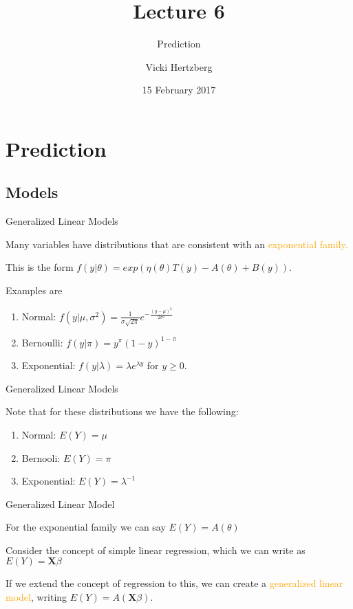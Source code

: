 \documentclass[10pt,ignorenonframetext,]{beamer}
\title{Lecture 6}
\subtitle{Prediction}
\author{Vicki Hertzberg}
\date{15 February 2017}
\providecommand{\tightlist}{%
\setlength{\itemsep}{0pt}\setlength{\parskip}{0pt}}
\begin{document}
\frame{\titlepage}

\begin{frame}
\tableofcontents[hideallsubsections]
\end{frame}

\section{Prediction}\label{prediction}

\subsection{Models}\label{models}

\begin{frame}{Generalized Linear Models}

Many variables have distributions that are consistent with an
\textcolor{orange}{exponential family.}

\bigskip This is the form
\(f(y|\theta) = exp(\eta(\theta)T(y) - A(\theta) + B(y))\).

Examples are

\begin{enumerate}[<+->]
\def\labelenumi{\arabic{enumi}.}
\tightlist
\item
  Normal:
  \(f(y|\mu, \sigma^2) = \frac{1}{\sigma \sqrt{2\pi}}e^{-\frac{(y-\mu)^2}{2\sigma^2}}\)
\item
  Bernoulli: \(f(y|\pi) = y^{\pi}(1-y)^{1-\pi}\)
\item
  Exponential: \(f(y|\lambda) = \lambda e^{\lambda y}\) for \(y \ge 0.\)
\end{enumerate}

\end{frame}

\begin{frame}{Generalized Linear Models}

Note that for these distributions we have the following:

\begin{enumerate}[<+->]
\def\labelenumi{\arabic{enumi}.}
\tightlist
\item
  Normal: \(E(Y) = \mu\)
\item
  Bernooli: \(E(Y) = \pi\)
\item
  Exponential: \(E(Y)=\lambda^{-1}\)
\end{enumerate}

\end{frame}

\begin{frame}{Generalized Linear Model}

For the exponential family we can say \(E(Y) = A(\theta)\)

Consider the concept of simple linear regression, which we can write as
\(E(Y) = \boldsymbol{X}\beta\)

If we extend the concept of regression to this, we can create a
\textcolor{orange}{generalized linear model}, writing
\(E(Y) = A(\boldsymbol{X}\beta)\).

\end{frame}
\end{document}
